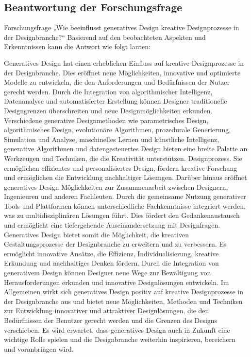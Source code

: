\subsection*{Beantwortung der Forschungsfrage}

Forschungsfrage „Wie beeinflusst generatives Design kreative Designprozesse in der Designbranche?“ Basierend auf den beobachteten Aspekten und Erkenntnissen kann die Antwort wie folgt lauten: 
 
 Generatives Design hat einen erheblichen Einfluss auf kreative Designprozesse in der Designbranche. Dies eröffnet neue Möglichkeiten,  innovative und optimierte Modelle zu entwickeln, die den Anforderungen und Bedürfnissen der Nutzer gerecht werden. Durch die Integration von algorithmischer Intelligenz, Datenanalyse und automatisierter Erstellung können Designer traditionelle Designgrenzen überschreiten und neue Designmöglichkeiten erkunden. 
 Verschiedene generative Designmethoden wie parametrisches Design, algorithmisches Design, evolutionäre Algorithmen, prozedurale Generierung, Simulation und Analyse, maschinelles Lernen und künstliche Intelligenz, generative Algorithmen und datengesteuertes Design bieten eine breite Palette an Werkzeugen und Techniken, die die Kreativität unterstützen. Designprozess. Sie ermöglichen effizientes und personalisiertes Design, fördern kreative Forschung und ermöglichen die Entwicklung nachhaltiger Lösungen.  Darüber hinaus eröffnet generatives Design Möglichkeiten zur Zusammenarbeit  zwischen Designern, Ingenieuren und anderen Fachleuten. Durch die gemeinsame Nutzung generativer Tools und Plattformen können unterschiedliche Fachkenntnisse integriert werden, was zu multidisziplinären Lösungen führt. Dies fördert den Gedankenaustausch und ermöglicht eine tiefergehende Auseinandersetzung mit Designfragen. 
 Generatives Design bietet somit die Möglichkeit, die kreativen Gestaltungsprozesse  der Designbranche zu erweitern und zu verbessern. Es ermöglicht innovative Ansätze, die Effizienz, Individualisierung, kreative Erkundung und nachhaltiges Denken fördern. Durch die Integration von generativem Design können Designer neue Wege zur Bewältigung von Herausforderungen erkunden und innovative Designlösungen entwickeln. 
 Im Allgemeinen wirkt sich generatives Design positiv auf kreative Designprozesse in der Designbranche aus und bietet neue Möglichkeiten, Methoden und Techniken zur Entwicklung innovativer und attraktiver Designlösungen, die den Bedürfnissen der Benutzer gerecht werden und die  Grenzen des Designs verschieben. Es wird erwartet, dass generatives Design auch in Zukunft eine wichtige Rolle spielen und die Designbranche weiterhin inspirieren, bereichern und voranbringen wird.
